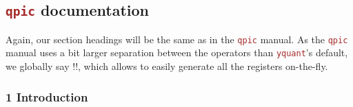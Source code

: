\documentclass{scrartcl}
\def\pkg#1{\textcolor{brown}{\texttt{#1}}}
\def\Yquant{\pkg{yquant}}
\begin{document}
      \subsection[\texorpdfstring{\pkg{qpic}}{qpic} documentation]{\pkg{qpic} documentation}
      \begingroup
         Again, our section headings will be the same as in the \pkg{qpic} manual.
         As the \pkg{qpic} manual uses a bit larger separation between the operators than \Yquant's default, we globally say \tex!!, which allows to easily generate all the registers on\hyp the\hyp fly.

         \subsubsection{1 Introduction}
            \begingroup%
\end{document}
